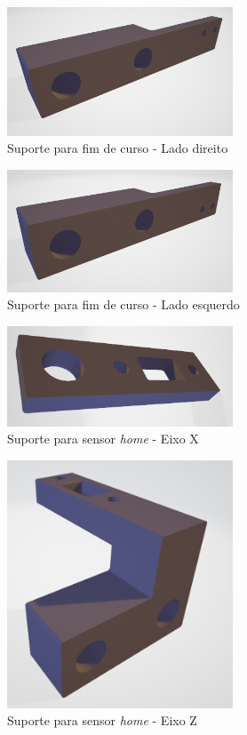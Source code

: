 \documentclass[
	article,			%
	11pt,				%
	oneside,			%
	a4paper,			%
	section=TITLE,		%
	english,			%
	brazil,				%
	sumario=tradicional
	]{abntex2}
\begin{document}
\begin{figure}[H]
    \centering
    \includegraphics[width=0.6\textwidth]{img/fcdir.png}
    \caption{Suporte para fim de curso - Lado direito}
    \label{fig:fcdir}
\end{figure}
\begin{figure}[H]
    \centering
    \includegraphics[width=0.6\textwidth]{img/fcesq.png}
    \caption{Suporte para fim de curso - Lado esquerdo}
    \label{fig:fcesq}
\end{figure}
\begin{figure}[H]
    \centering
    \includegraphics[width=0.6\textwidth]{img/homex.png}
    \caption{Suporte para sensor \textit{home} - Eixo X}
    \label{fig:homex}
\end{figure}
\begin{figure}[H]
    \centering
    \includegraphics[width=0.6\textwidth]{img/homez.png}
    \caption{Suporte para sensor \textit{home} - Eixo Z}
    \label{fig:homez}
\end{figure}
\end{document}
